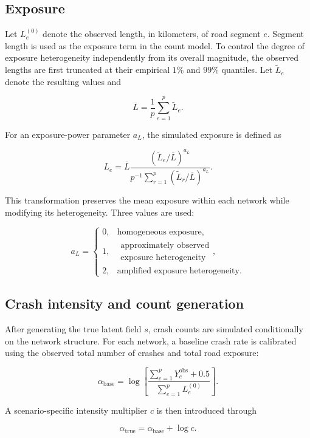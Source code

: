 \documentclass[11pt]{article}
\begin{document}
\subsection{Exposure}

Let $L_e^{(0)}$ denote the observed length, in kilometers, of road segment $e$. Segment length is used as the exposure term in the count model. To control the degree of exposure heterogeneity independently from its overall magnitude, the observed lengths are first truncated at their empirical $1\%$ and $99\%$ quantiles. Let $\widetilde L_e$ denote the resulting values and

\[
\overline L
=
\frac{1}{p}\sum_{e=1}^{p}\widetilde L_e.
\]

For an exposure-power parameter $a_L$, the simulated exposure is defined as

\[
L_e
=
\overline L
\frac{
	(\widetilde L_e/\overline L)^{a_L}
}{
	p^{-1}\sum_{r=1}^{p}
	(\widetilde L_r/\overline L)^{a_L}
}.
\]

This transformation preserves the mean exposure within each network while modifying its heterogeneity. Three values are used:

\[
a_L=
\begin{cases}
	0, & \text{homogeneous exposure},\\
	1, & \begin{gathered}\text{approximately observed}\\\text{exposure heterogeneity}\end{gathered},\\
	2, & \text{amplified exposure heterogeneity}.
\end{cases}
\]



\subsection{Crash intensity and count generation}

After generating the true latent field $s$, crash counts are simulated conditionally on the network structure. For each network, a baseline crash rate is calibrated using the observed total number of crashes and total road exposure:

\[
\alpha_{\mathrm{base}}
=
\log
\left[
\frac{
	\sum_{e=1}^{p}Y_e^{\mathrm{obs}}+0.5
}{
	\sum_{e=1}^{p}L_e^{(0)}
}
\right].
\]

A scenario-specific intensity multiplier $c$ is then introduced through

\[
\alpha_{\mathrm{true}}
=
\alpha_{\mathrm{base}}+\log c.
\]
\end{document}
